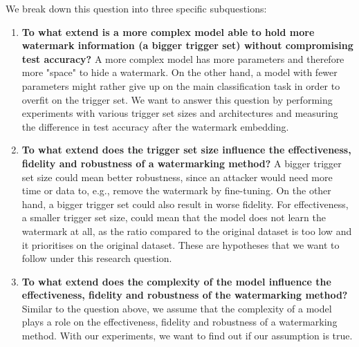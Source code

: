 We break down this question into three specific subquestions:
\begin{enumerate}
\item \textbf{To what extend is a more complex model able to hold more watermark information (a bigger trigger set) without compromising test accuracy?} A more complex model has more parameters and therefore more "space" to hide a watermark. On the other hand, a model with fewer parameters might rather give up on the main classification task in order to overfit on the trigger set. We want to answer this question by performing experiments with various trigger set sizes and architectures and measuring the difference in test accuracy after the watermark embedding.

\item \textbf{To what extend does the trigger set size influence the effectiveness, fidelity and robustness of a watermarking method?} A bigger trigger set size could mean better robustness, since an attacker would need more time or data to, e.g., remove the watermark by fine-tuning. On the other hand, a bigger trigger set could also result in worse fidelity. For effectiveness, a smaller trigger set size, could mean that the model does not learn the watermark at all, as the ratio compared to the original dataset is too low and it prioritises on the original dataset. These are hypotheses that we want to follow under this research question.

\item \textbf{To what extend does the complexity of the model influence the effectiveness, fidelity and robustness of the watermarking method?} Similar to the question above, we assume that the complexity of a model plays a role on the effectiveness, fidelity and robustness of a watermarking method. With our experiments, we want to find out if our assumption is true.
\end{enumerate}



